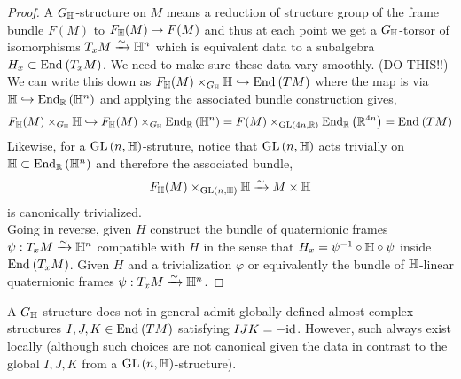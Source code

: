 \documentclass[12pt]{extarticle}
\newcommand{\R}{\mathbb{R}}
\begin{document}
\begin{proof}
A $G_{\mathbb{H}}$-structure on $M$ means a reduction of structure group of the frame bundle $F(M)$ to $F_{\mathbb{H}}(M) \to F(M)$ and thus at each point we get a $G_{\mathbb{H}}$-torsor of isomorphisms $T_x M \xrightarrow{\sim} \mathbb{H}^n$ which is equivalent data to a subalgebra $H_x \subset \mathrm{End}_{}\left(T_x M\right)$. We need to make sure these data vary smoothly. (DO THIS!!) We can write this down as $F_{\mathbb{H}}(M) \times_{G_{\mathbb{H}}} \mathbb{H} \hookrightarrow \mathrm{End}_{}\left(TM\right)$ where the map is via $\H \embed \End{\R}{\H^n}$ and applying the associated bundle construction gives,
\[ F_{\H}(M) \times_{G_{\H}} \H \embed F_{\H}(M) \times_{G_{\H}} \End{\R}{\H^n} = F(M) \times_{\GL{4n, \R}} \End{\R}{\R^{4n}} = \End{}{TM} \]
Likewise, for a $\mathrm{GL}\left(n,\mathbb{H} \right)$-struture, notice that $\mathrm{GL}\left(n,\mathbb{H} \right)$ acts trivially on $\H \subset \End{\R}{\H^n}$ and therefore the associated bundle,
\[ F_{\mathbb{H}}(M) \times_{\mathrm{GL}\left(n, \mathbb{H} \right)} \mathbb{H} \xrightarrow{\sim} M \times \mathbb{H} \]
is canonically trivialized.
\bigskip\\
Going in reverse, given $H$ construct the bundle of quaternionic frames $\psi : T_x M \xrightarrow{\sim} \mathbb{H}^n$ compatible with $H$ in the sense that $H_x = \psi^{-1} \circ \mathbb{H} \circ \psi$ inside $\mathrm{End}_{}\left(T_x M\right)$. Given $H$ and a trivialization $\varphi$ or equivalently the bundle of $\mathbb{H}$-linear quaternionic frames $\psi : T_x M \xrightarrow{\sim} \mathbb{H}^n$.
\end{proof}

\begin{rmk}
A $G_{\mathbb{H}}$-structure does not in general admit globally defined almost complex structures $I, J, K \in \mathrm{End}_{}\left(TM\right)$ satisfying $IJK = - \mathrm{id}$. However, such always exist locally (although such choices are not canonical given the data in contrast to the global $I,J,K$ from a $\mathrm{GL}\left(n, \mathbb{H} \right)$-structure).
\end{rmk}


\renewcommand{\C}{\mathbb{C}}
\end{document}
